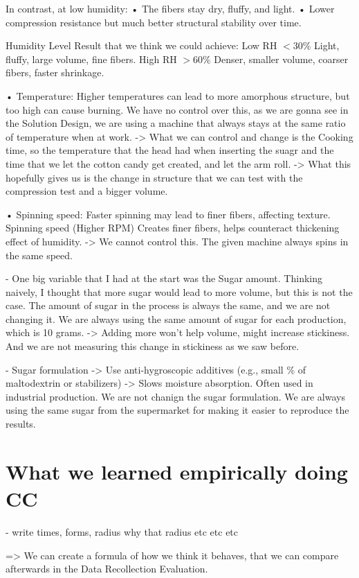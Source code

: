 In contrast, at low humidity:
	•	The fibers stay dry, fluffy, and light.
	•	Lower compression resistance but much better structural stability over time.

    Humidity Level
        Result that we think we could achieve:
        Low RH \(<30\%\)
        Light, fluffy, large volume, fine fibers.
        High RH \(>60\%\)
        Denser, smaller volume, coarser fibers, faster shrinkage.


    •	Temperature: Higher temperatures can lead to more amorphous structure, but too high can cause burning. We have no control over this, as we are gonna see in the Solution Design, we are using a machine that always stays at the same ratio of temperature when at work. 
    -> What we can control and change is the Cooking time, so the temperature that the head had when inserting the suagr and the time that we let the cotton candy get created, and let the arm roll. -> What this hopefully gives us is the change in structure that we can test with the compression test and a bigger volume.

    •	Spinning speed: Faster spinning may lead to finer fibers, affecting texture. Spinning speed (Higher RPM) Creates finer fibers, helps counteract thickening effect of humidity. -> We cannot control this. The given machine always spins in the same speed.

    -  One big variable that I had at the start was the Sugar amount. Thinking naively, I thought that more sugar would lead to more volume, but this is not the case. The amount of sugar in the process is always the same, and we are not changing it. We are always using the same amount of sugar for each production, which is 10 grams. -> Adding more won’t help volume, might increase stickiness. And we are not measuring this change in stickiness as we saw before.

    - Sugar formulation -> Use anti-hygroscopic additives (e.g., small \% of maltodextrin or stabilizers) -> Slows moisture absorption. Often used in industrial production. We are not chanign the sugar formulation. We are always using the same sugar from the supermarket for making it easier to reproduce the results.

\section{What we learned empirically doing CC}
    - write times, forms, radius why that radius etc etc etc

    => We can create a formula of how we think it behaves, that we can compare afterwards in the Data Recollection Evaluation.

